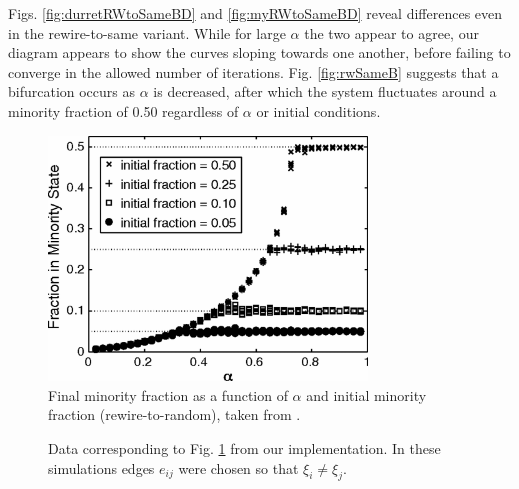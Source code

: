 \documentclass[11pt]{article}
\begin{document}
Figs. \ref{fig:durretRWtoSameBD} and \ref{fig:myRWtoSameBD} reveal differences even in the rewire-to-same variant. While for large $\alpha$ the two appear to agree, our diagram appears to show the curves sloping towards one another, before failing to converge in the allowed number of iterations. Fig. \ref{fig:rwSameB} suggests that a bifurcation occurs as $\alpha$ is decreased, after which the system fluctuates around a minority fraction of 0.50 regardless of $\alpha$ or initial conditions.

\begin{figure}
  \centering
  \includegraphics[height=65mm]{rwToRandomBifDiag}
  \caption{Final minority fraction as a function of $\alpha$ and initial minority fraction (rewire-to-random), taken from \cite{durret:pnas12}.}
  \label{fig:durretRWtoRandomBD}
\end{figure}

\begin{figure}
  \centering
  \hspace{3mm}
  \caption{Data corresponding to Fig. \ref{fig:durretRWtoRandomBD} from our implementation. In these simulations edges $e_{ij}$ were chosen so that $\xi_{i} \neq \xi_{j}$.}
  \label{fig:myRWtoRandomFromDiffBD}
\end{figure}
\end{document}
